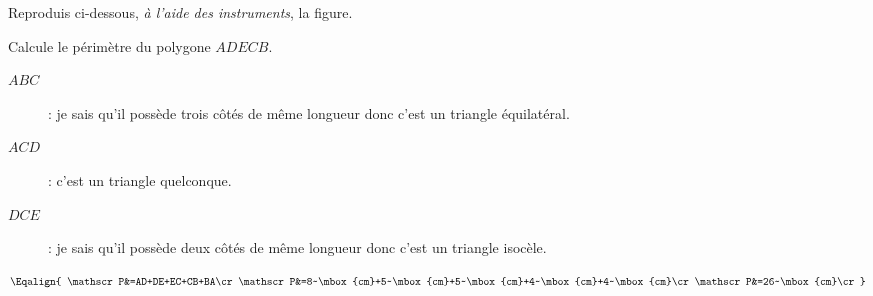 \begin{myenumerate}
  \setcounter{enumi}{1}
\item Reproduis ci-dessous, {\em à l'aide des instruments}, la figure.
\vspace{9cm}
\item Calcule le périmètre du polygone $ADECB$.
\end{myenumerate}
  \begin{myenumerate}
    \item \begin{description}
      \item[$ABC$] : je sais qu'il possède {\cursive trois côtés de même
          longueur} donc c'est un
        triangle {\cursive équilatéral}.
      \item[$ACD$] : c'est un triangle {\cursive quelconque}.
      \item[$DCE$] : je sais qu'il possède {\cursive deux côtés de
          même longueur} donc c'est un triangle {\cursive isocèle}.
      \end{description}
      \setcounter{enumi}{2}
    \item \[\Eqalign{
        \mathscr P&=AD+DE+EC+CB+BA\cr
        \mathscr P&=8~\mbox{cm}+5~\mbox{cm}+5~\mbox{cm}+4~\mbox{cm}+4~\mbox{cm}\cr
        \mathscr P&=26~\mbox{cm}\cr
        }\]
  \end{myenumerate}